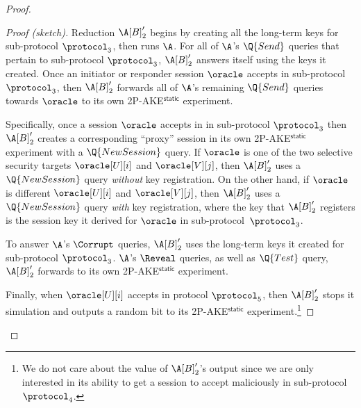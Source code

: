 \begin{proof}
\begin{proof}[Proof (sketch)]
Reduction $\A[B]'_2$ begins by creating all the long-term keys for sub-protocol $\protocol_3$, 
then runs $\A$.
For all of $\A$'s $\Q{Send}$ queries that pertain to sub-protocol $\protocol_3$,
$\A[B]'_2$ answers itself using the keys it created.
Once an initiator or responder session $\oracle$ accepts in sub-protocol $\protocol_3$,
then $\A[B]'_2$ forwards all of $\A$'s remaining $\Q{Send}$ queries towards $\oracle$ to its own 2P-AKE$^\mathsf{static}$ experiment.


Specifically,
once a session $\oracle$ accepts in in sub-protocol $\protocol_3$
then $\A[B]'_2$ creates a corresponding ``proxy'' session in its own 2P-AKE$^\mathsf{static}$ experiment with a $\Q{NewSession}$ query.
If $\oracle$ is one of the two selective security targets $\oracle[U][i]$ and $\oracle[V][j]$,
then $\A[B]'_2$ uses a $\Q{NewSession}$ query \emph{without} key registration.
On the other hand,
if $\oracle$ is different $\oracle[U][i]$ and $\oracle[V][j]$,
then $\A[B]'_2$ uses a $\Q{NewSession}$ query \emph{with} key registration,
where the key that $\A[B]'_2$ registers is the session key it derived for $\oracle$ in sub-protocol~$\protocol_3$. 
 


To answer $\A$'s $\Corrupt$ queries,
$\A[B]'_2$ uses the long-term keys it created for sub-protocol $\protocol_3$.
$\A$'s  $\Reveal$ queries,
as well as $\Q{Test}$ query,
$\A[B]'_2$ forwards to its own 2P-AKE$^\mathsf{static}$ experiment.



Finally, 
when $\oracle[U][i]$ accepts in protocol $\protocol_5$,
then $\A[B]'_2$ stops it simulation and outputs a random bit to its 2P-AKE$^\mathsf{static}$ experiment.\footnote{We 
do not care about the value of $\A[B]'_2$'s output since we are only interested in its ability to get a session to accept maliciously in sub-protocol $\protocol_4$.
} 
\medskip



\end{proof}
\end{proof}
